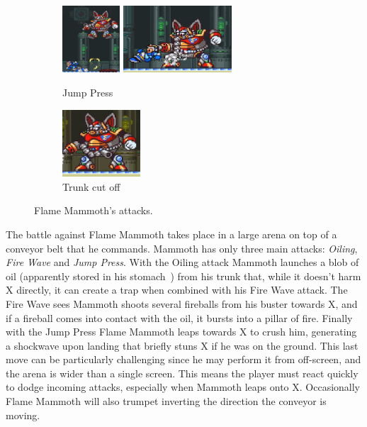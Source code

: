 \begin{figure}[htp]
	\ContinuedFloat
	\centering
	\begin{subfigure}{.55\textwidth}
		\centering
		\includegraphics[height=2.5cm]{figures/X1/Flame_mammoth/Mammoth_press_1.jpg}
		\includegraphics[height=2.5cm]{figures/X1/Flame_mammoth/Mammoth_press_2.jpg}
		\caption{Jump Press}
	\end{subfigure}
	\begin{subfigure}{0.25\textwidth}
		\centering
		\includegraphics[height=2.5cm]{figures/X1/Flame_mammoth/Mammoth_cut.jpg}
		\caption{Trunk cut off}
	\end{subfigure}
	\caption{Flame Mammoth's attacks.}
\end{figure}
The battle against Flame Mammoth takes place in a large arena on top of a conveyor belt that he commands. Mammoth has only three main attacks: \emph{Oiling}, \emph{Fire Wave} and \emph{Jump Press}. With the Oiling attack Mammoth launches a blob of oil (apparently stored in his stomach~\cite{wayback:X_resources}) from his trunk that, while it doesn't harm X directly, it can create a trap when combined with his Fire Wave attack. The Fire Wave sees Mammoth shoots several fireballs from his buster towards X, and if a fireball comes into contact with the oil, it bursts into a pillar of fire. Finally with the Jump Press Flame Mammoth leaps towards X to crush him, generating a shockwave upon landing that briefly stuns X if he was on the ground. This last move can be particularly challenging since he may perform it from off-screen, and the arena is wider than a single screen. This means the player must react quickly to dodge incoming attacks, especially when Mammoth leaps onto X. Occasionally Flame Mammoth will also trumpet inverting the direction the conveyor is moving. 


